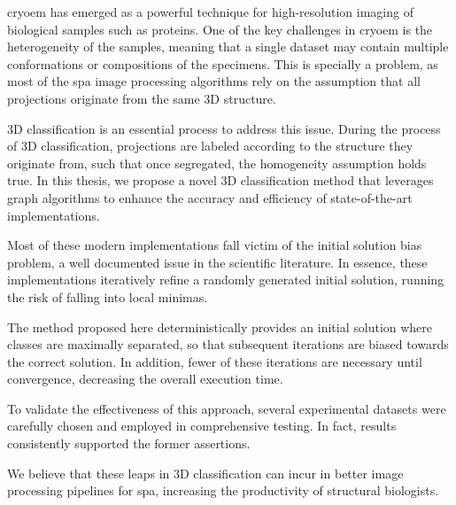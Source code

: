 \documentclass[../main.tex]{subfiles}
\begin{document}
\Gls{cryoem} has emerged as a powerful technique for high-resolution imaging of biological samples such as proteins. One of the key challenges in \gls{cryoem} is the heterogeneity of the samples, meaning that a single dataset may contain multiple conformations or compositions of the specimens. This is specially a problem, as most of the \gls{spa} image processing algorithms rely on the assumption that all projections originate from the same 3D structure. 

3D classification is an essential process to address this issue. During the process of 3D classification, projections are labeled according to the structure they originate from, such that once segregated, the homogeneity assumption holds true. In this thesis, we propose a novel 3D classification method that leverages graph algorithms to enhance the accuracy and efficiency of state-of-the-art implementations.

Most of these modern implementations fall victim of the initial solution bias problem, a well documented issue in the scientific literature. In essence, these implementations iteratively refine a randomly generated initial solution, running the risk of falling into local minimas. 

The method proposed here deterministically provides an initial solution where classes are maximally separated, so that subsequent iterations are biased towards the correct solution. In addition, fewer of these iterations are necessary until convergence, decreasing the overall execution time.

To validate the effectiveness of this approach, several experimental datasets were carefully chosen and employed in comprehensive testing. In fact, results consistently supported the former assertions. 

We believe that these leaps in 3D classification can incur in better image processing pipelines for \gls{spa}, increasing the productivity of structural biologists.
\end{document}
